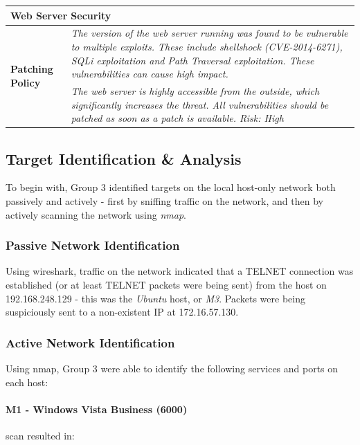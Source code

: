 \begin{table}
\begin{tabular}{|l|p{10.5cm}|} 
\hline
\multicolumn{2}{|l|}{Web Server Security}                              \\ \hline

\multirow{2}{*}{\textbf{Patching Policy}} & \textit{The version of the web server running was found to be vulnerable to multiple exploits. These include shellshock (CVE-2014-6271), SQLi exploitation and Path Traversal exploitation. These vulnerabilities can cause high impact.}    \\ \cline{2-2} 
                                               & \textit{The web server is highly accessible from the outside, which significantly increases the threat. All vulnerabilities should be patched as soon as a patch is available. Risk: High} \\ \hline

\end{tabular}
\end{table}

\subsection{Target Identification \& Analysis}
To begin with, Group 3 identified targets on the local host-only network both passively and actively - first by sniffing traffic on the network, and then by actively scanning the network using \textit{nmap}.

\subsubsection{Passive Network Identification}
Using wireshark, traffic on the network indicated that a TELNET connection was established (or at least TELNET packets were being sent) from the host on 192.168.248.129 - this was the \textit{Ubuntu} host, or \textit{M3}. Packets were being suspiciously sent to a non-existent IP at 172.16.57.130.

\subsubsection{Active Network Identification}
Using nmap, Group 3 were able to identify the following services and ports on each host:

\paragraph{M1 - Windows Vista Business (6000)}
scan resulted in:

